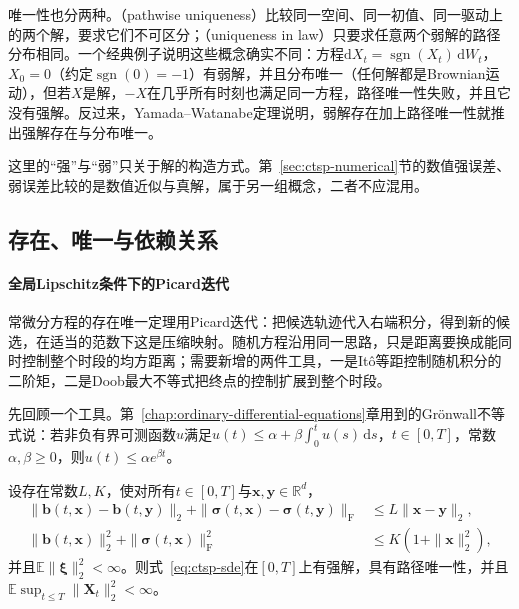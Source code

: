 唯一性也分两种。（pathwise uniqueness）比较同一空间、同一初值、同一驱动上的两个解，要求它们不可区分；（uniqueness in law）只要求任意两个弱解的路径分布相同。一个经典例子说明这些概念确实不同：方程$\mathrm dX_t=\operatorname{sgn}(X_t)\,\mathrm dW_t$，$X_0=0$（约定$\operatorname{sgn}(0)=-1$）有弱解，并且分布唯一（任何解都是Brownian运动），但若$X$是解，$-X$在几乎所有时刻也满足同一方程，路径唯一性失败，并且它没有强解。反过来，Yamada--Watanabe定理说明，弱解存在加上路径唯一性就推出强解存在与分布唯一。

这里的“强”与“弱”只关于解的构造方式。第~\ref{sec:ctsp-numerical}节的数值强误差、弱误差比较的是数值近似与真解，属于另一组概念，二者不应混用。

\subsection{存在、唯一与依赖关系}
\label{sec:ctsp-sde-existence}

\paragraph{全局Lipschitz条件下的Picard迭代}
常微分方程的存在唯一定理用Picard迭代：把候选轨迹代入右端积分，得到新的候选，在适当的范数下这是压缩映射。随机方程沿用同一思路，只是距离要换成能同时控制整个时段的均方距离；需要新增的两件工具，一是Itô等距控制随机积分的二阶矩，二是Doob最大不等式把终点的控制扩展到整个时段。

先回顾一个工具。第~\ref{chap:ordinary-differential-equations}章用到的Grönwall不等式说：若非负有界可测函数$u$满足$u(t)\leq\alpha+\beta\int_0^tu(s)\,\mathrm ds$，$t\in[0,T]$，常数$\alpha,\beta\geq0$，则$u(t)\leq\alpha e^{\beta t}$。

\begin{theorem}[强解的存在唯一]
  \label{thm:ctsp-sde-existence}
  设存在常数$L,K$，使对所有$t\in[0,T]$与$\bm x,\bm y\in\mathbb R^d$，
  \begin{align*}
    \|\bm b(t,\bm x)-\bm b(t,\bm y)\|_2+\|\bm\sigma(t,\bm x)-\bm\sigma(t,\bm y)\|_{\mathrm F}&\leq L\|\bm x-\bm y\|_2,\\
    \|\bm b(t,\bm x)\|_2^2+\|\bm\sigma(t,\bm x)\|_{\mathrm F}^2&\leq K(1+\|\bm x\|_2^2),
  \end{align*}
  并且$\mathbb E\|\bm\xi\|_2^2<\infty$。则式~\eqref{eq:ctsp-sde}在$[0,T]$上有强解，具有路径唯一性，并且$\mathbb E\sup_{t\leq T}\|\bm X_t\|_2^2<\infty$。
\end{theorem}

